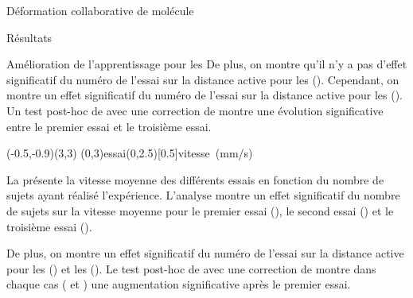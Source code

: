 \documentclass[myfrancais]{mythesis}
\begin{document}
\begin{mychapter}{Déformation collaborative de molécule}
\begin{mysection}{Résultats}
\begin{mysubsection}{Amélioration de l'apprentissage pour les }
				De plus, on montre qu'il n'y a pas d'effet significatif du numéro de l'essai  sur la distance active  pour les  ().
				Cependant, on montre un effet significatif du numéro de l'essai  sur la distance active  pour les  ().
				Un test post-hoc de  avec une correction de  montre une évolution significative entre le premier essai et le troisième essai.

				\begin{myfigure}
					\begin{myps}(-0.5,-0.9)(3,3)
						\myaxes(0,3){essai}(0,2.5)[0.5]{vitesse~(mm/s)}
					\end{myps}
				\end{myfigure}

				La  présente la vitesse moyenne  des différents essais  en fonction du nombre de sujets  ayant réalisé l'expérience.
				L'analyse montre un effet significatif du nombre de sujets  sur la vitesse moyenne  pour le premier essai (), le second essai () et le troisième essai ().

				De plus, on montre un effet significatif du numéro de l'essai  sur la distance active  pour les  () et les  ().
				Le test post-hoc de  avec une correction de  montre dans chaque cas ( et ) une augmentation significative après le premier essai.


\end{mysubsection}
\end{mysection}
\end{mychapter}
\end{document}
